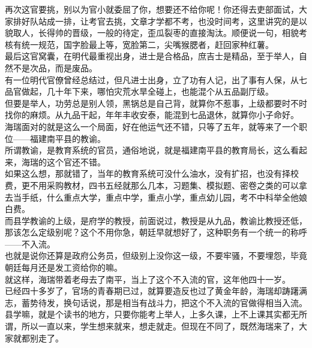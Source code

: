 \begin{multicols}{\theparacolNo}
再次这官要挑，别以为官小就委屈了你，想要还不给你呢！你还得去吏部面试，大家排好队站成一排，让考官去挑，文章才学都不考，也没时间考，这里讲究的是以貌取人，长得帅的晋级，一般的待定，歪瓜裂枣的直接淘汰。顺便说一句，相貌考核有统一规范，国字脸最上等，宽脸第二，尖嘴猴腮者，赶回家种红薯。\\

最后这官窝囊，在明代最重视出身，进士是合格品，庶吉士是精品，至于举人，自然不是次品，而是废品。\\

有一位明代官僚曾经总结过，但凡进士出身，立了功有人记，出了事有人保，从七品官做起，几十年下来，哪怕灾荒水旱全碰上，也能混个从五品副厅级。\\

但要是举人，功劳总是别人领，黑锅总是自己背，就算你不惹事，上级都要时不时找你的麻烦。从九品干起，年年丰收安泰，能混到七品退休，就算你小子命好。\\

海瑞面对的就是这么一个局面，好在他运气还不错，只等了五年，就等来了一个职位——福建南平县的教谕。\\

所谓教谕，是教育系统的官员，通俗地说，就是福建南平县的教育局长，这么看起来，海瑞的这个官还不错。\\

如果这么想，那就错了，当年的教育系统可没什么油水，没有扩招，也没有择校费，更不用采购教材，四书五经就那么几本，习题集、模拟题、密卷之类的可以拿去当手纸，什么重点大学，重点中学，重点小学，重点幼儿园，考不中科举全他娘白费。\\

而县学教谕的上级，是府学的教授，前面说过，教授是从九品，教谕比教授还低，那该怎么定级别呢？这个不用你急，朝廷早就想好了，这种职务有一个统一的称呼——不入流。\\

也就是说你还算是政府公务员，但级别上没你这一级，不要牢骚，不要埋怨，毕竟朝廷每月还是发工资给你的嘛。\\

就这样，海瑞带着老母去了南平，当上了这个不入流的官，这年他四十一岁。\\

已经四十多岁了，官场的青春期已过，就算要造反也过了黄金年龄，海瑞却踌躇满志，蓄势待发，换句话说，那是相当有战斗力，把这个不入流的官做得相当入流。\\

县学嘛，就是个读书的地方，只要你能考上举人，上多久课，上不上课其实都无所谓，所以一直以来，学生想来就来，想走就走。但现在不同了，既然海瑞来了，大家就都别走了。\\


\end{multicols}
